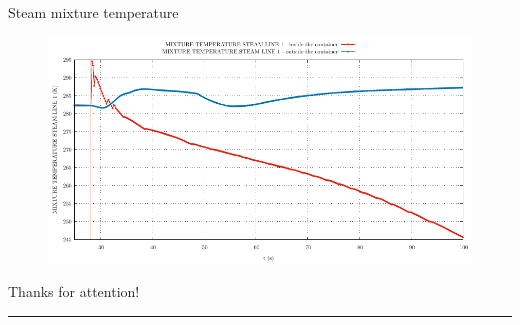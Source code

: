 \begin{frame}{Steam mixture temperature}
	\begin{figure}
		\centering
		\includegraphics[width=\textwidth]{./graphs/MIXTURE TEMPERATURE STEAM LINE 1_comp.pdf}
		
	\end{figure}
	
\end{frame}


%		
%	
%		
%	
%






\begin{frame}
\Large{{Thanks for attention!}}
\vspace{0.5cm}
\hrule
\vspace{3cm}
\end{frame}

\nologo



